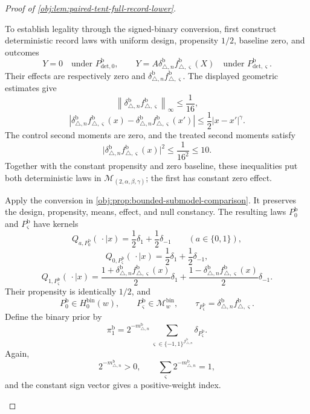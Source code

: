 \documentclass[11pt]{article}
\begin{document}
\begin{proof}[Proof of \cref{obj:lem:paired-tent-full-record-lower}]
\begin{enumerate}
To establish legality through the signed-binary conversion, first construct
deterministic record laws with uniform design, propensity \(1/2\), baseline
zero, and outcomes
\[
Y=0
\quad\text{under }P_{\mathrm{det},0}^{\mathrm b},
\qquad
Y=A\delta_{\triangle,n}^{\mathrm b}
f_{\triangle,\varsigma}^{\mathrm b}(X)
\quad\text{under }P_{\mathrm{det},\varsigma}^{\mathrm b}.
\]
Their effects are respectively zero and
\(\delta_{\triangle,n}^{\mathrm b}f_{\triangle,\varsigma}^{\mathrm b}\).
The displayed geometric estimates give
\[
\left\|
\delta_{\triangle,n}^{\mathrm b}f_{\triangle,\varsigma}^{\mathrm b}
\right\|_\infty\le\frac1{16},
\]
\[
\left|
\delta_{\triangle,n}^{\mathrm b}f_{\triangle,\varsigma}^{\mathrm b}(x)
-\delta_{\triangle,n}^{\mathrm b}f_{\triangle,\varsigma}^{\mathrm b}(x')
\right|
\le\frac12|x-x'|^\gamma.
\]
The control second moments are zero, and the treated second moments satisfy
\[
\bigl|\delta_{\triangle,n}^{\mathrm b}
f_{\triangle,\varsigma}^{\mathrm b}(x)\bigr|^2
\le\frac1{16^2}\le10.
\]
Together with the constant propensity and zero baseline, these inequalities
put both deterministic laws in
\(\mathcal M_{(2,\alpha,\beta,\gamma)}\); the first has constant zero effect.

Apply the conversion in \cref{obj:prop:bounded-submodel-comparison}. It
preserves the design, propensity, means, effect, and null constancy. The
resulting laws \(P_0^{\mathrm b}\) and \(P_\varsigma^{\mathrm b}\) have kernels
\[
Q_{a,P_0^{\mathrm b}}(\,\cdot\mid x)
=\frac12\delta_1+\frac12\delta_{-1}
\qquad(a\in\{0,1\}),
\]
\[
Q_{0,P_\varsigma^{\mathrm b}}(\,\cdot\mid x)
=\frac12\delta_1+\frac12\delta_{-1},
\]
\[
Q_{1,P_\varsigma^{\mathrm b}}(\,\cdot\mid x)
=
\frac{1+\delta_{\triangle,n}^{\mathrm b}
f_{\triangle,\varsigma}^{\mathrm b}(x)}2\delta_1
+
\frac{1-\delta_{\triangle,n}^{\mathrm b}
f_{\triangle,\varsigma}^{\mathrm b}(x)}2\delta_{-1}.
\]
Their propensity is identically \(1/2\), and
\[
P_0^{\mathrm b}\in H_0^{\mathrm{bin}}(w),
\qquad
P_\varsigma^{\mathrm b}\in\mathcal M_w^{\mathrm{bin}},
\qquad
\tau_{P_\varsigma^{\mathrm b}}
=\delta_{\triangle,n}^{\mathrm b}f_{\triangle,\varsigma}^{\mathrm b}.
\]
Define the binary prior by
\[
\pi_1^{\mathrm b}
=
2^{-m_{\triangle,n}^{\mathrm b}}
\sum_{\varsigma\in\{-1,1\}^{\mathscr J_{\triangle,n}^{\mathrm b}}}
\delta_{P_\varsigma^{\mathrm b}}.
\]
Again,
\[
2^{-m_{\triangle,n}^{\mathrm b}}>0,
\qquad
\sum_\varsigma2^{-m_{\triangle,n}^{\mathrm b}}=1,
\]
and the constant sign vector gives a positive-weight index.


\end{enumerate}
\end{proof}
\end{document}
